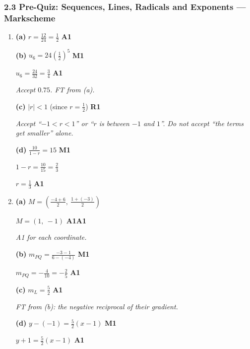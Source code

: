 \documentclass[12pt, twoside]{article}
\begin{document}
\subsubsection*{2.3 Pre-Quiz: Sequences, Lines, Radicals and Exponents --- Markscheme}

\begin{enumerate}[itemsep=0.3cm]

\item[1.] [Maximum mark: 6]

\textbf{(a)} $r = \frac{12}{24} = \frac{1}{2}$ \hfill \textbf{A1}

\textbf{(b)} $u_{6} = 24\left(\frac{1}{2}\right)^{5}$ \hfill \textbf{M1}

$u_{6} = \frac{24}{32} = \frac{3}{4}$ \hfill \textbf{A1}

\emph{Accept $0.75$. FT from (a).}

\textbf{(c)} $|r| < 1$ \quad (since $r = \frac{1}{2}$) \hfill \textbf{R1}

\emph{Accept ``$-1 < r < 1$'' or ``$r$ is between $-1$ and $1$''. Do not
accept ``the terms get smaller'' alone.}

\textbf{(d)} $\frac{10}{1 - r} = 15$ \hfill \textbf{M1}

$1 - r = \frac{10}{15} = \frac{2}{3}$

$r = \frac{1}{3}$ \hfill \textbf{A1}

\newpage

\item[2.] [Maximum mark: 9]

\textbf{(a)} $M = \left(\frac{-4 + 6}{2},\ \frac{1 + (-3)}{2}\right)$

$M = (1,\ -1)$ \hfill \textbf{A1A1}

\emph{A1 for each coordinate.}

\textbf{(b)} $m_{PQ} = \frac{-3 - 1}{6 - (-4)}$ \hfill \textbf{M1}

$m_{PQ} = -\frac{4}{10} = -\frac{2}{5}$ \hfill \textbf{A1}

\textbf{(c)} $m_{L} = \frac{5}{2}$ \hfill \textbf{A1}

\emph{FT from (b): the negative reciprocal of their gradient.}

\textbf{(d)} $y - (-1) = \frac{5}{2}(x - 1)$ \hfill \textbf{M1}

$y + 1 = \frac{5}{2}(x - 1)$ \hfill \textbf{A1}


\end{enumerate}
\end{document}
